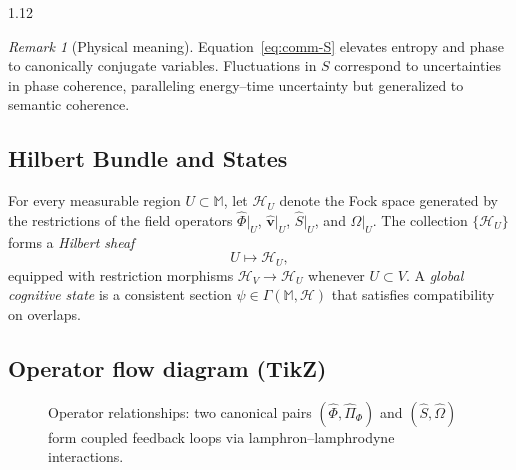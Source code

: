 \documentclass[12pt,a4paper]{article}
\numberwithin{equation}{section}
\theoremstyle{remark}
\newtheorem{remark}{Remark}[section]
\theoremstyle{definition}
\newcommand{\M}{\mathbb{M}}
\newcommand{\ii}{\mathrm{i}}
\begin{document}
\begin{spacing}{1.12}
\begin{remark}[Physical meaning]
Equation~\eqref{eq:comm-S} elevates entropy and phase to canonically conjugate variables.  Fluctuations in $S$ correspond to uncertainties in phase coherence, paralleling energy–time uncertainty but generalized to semantic coherence.
\end{remark}

\subsection{Hilbert Bundle and States}
\label{subsec:hilbert-bundle}

For every measurable region \( U \subset \M \), let \( \mathcal{H}_U \) denote the Fock space generated by the restrictions of the field operators \( \hat{\Phi}|_U \), \( \hat{\mathbf{v}}|_U \), \( \hat{S}|_U \), and \( \hat{\Omega}|_U \). The collection \( \{\mathcal{H}_U\} \) forms a \emph{Hilbert sheaf}
\[
U \longmapsto \mathcal{H}_U,
\]
equipped with restriction morphisms \( \mathcal{H}_V \to \mathcal{H}_U \) whenever \( U \subset V \). A \emph{global cognitive state} is a consistent section \( \psi \in \Gamma(\M, \mathscr{H}) \) that satisfies compatibility on overlaps.

\subsection{Operator flow diagram (TikZ)}
\label{subsec:operator-flow}

\begin{figure}[H]
\centering
{}
\caption{Operator relationships: two canonical pairs $(\hat{\Phi},\hat{\Pi}_\Phi)$ and $(\hat{S},\hat{\Omega})$ form coupled feedback loops via lamphron–lamphrodyne interactions.}
\label{fig:operator-flow}
\end{figure}


\end{spacing}
\end{document}
